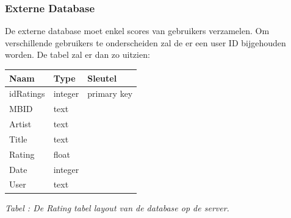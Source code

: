 \documentclass[11pt,a4paper]{article}
\newcounter{tabc}
\newcommand{\tabID} {%
   \stepcounter{tabc}%
   \thetabc}
\begin{document}
\newpage
	\subsubsection{Externe Database}
	\label{sec:Extdb}
	De externe database moet enkel scores van gebruikers verzamelen. Om verschillende gebruikers te onderscheiden zal de er een user ID bijgehouden worden. De tabel zal er dan zo uitzien: \\ \newline
		\begin{tabular}{| l | l | l | }
		\hline
		 Naam		& Type		& Sleutel		\\
		 \hline 
		 idRatings 	& integer 	& primary key 	\\
		 MBID 		& text 		& 				\\
		 Artist		& text 		& 				\\
		 Title 		& text 		& 				\\
		 Rating		& float 	& 				\\
		 Date 		& integer 	& 				\\
		 User		& text 		& 				\\
		\hline
		\end{tabular}
	
	\small \textit{Tabel \tabID : De Rating tabel layout van de database op de server.} \\ \normalsize
		
		
	
\newpage %

\end{document}
